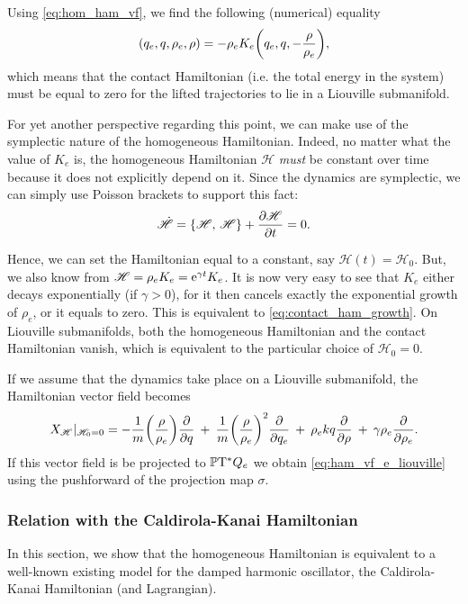 Using \cref{eq:hom_ham_vf}, we find the following (numerical) equality 
\begin{equation}
    [\intpr{X_\mathscr{H}}{\theta_e}](q_e, q, \rho_e, \rho) = -\rho_e K_e\qty(q_e, q, -\frac{\rho}{\rho_e}),
\end{equation}
which means that the contact Hamiltonian (i.e. the total energy in the system)
must be equal to zero for the lifted trajectories to lie in a Liouville submanifold.

For yet another perspective regarding this point, we can make use of the symplectic nature of the homogeneous Hamiltonian. Indeed, no matter what the value of \(K_e\) is, the homogeneous Hamiltonian \(\mathscr{H}\) \emph{must} be constant over time because it does not explicitly depend on it. Since the dynamics are symplectic, we can simply use Poisson brackets to support this fact:
\begin{equation}
     \dot{\mathscr{H}} = \qty{\mathscr{H},\,\mathscr{H}} + \pdv{\mathscr{H}}{t} = 0.
\end{equation}

Hence, we can set the Hamiltonian equal to a constant, say \(\mathscr{H}(t) = \mathscr{H}_0\). But, we also know from \(\mathscr{H} = \rho_e K_e = \mathrm{e}^{\gamma t} K_e\). It is now very easy to see that \(K_e\) either  decays exponentially (if \(\gamma > 0\)), for it then cancels exactly the exponential growth of \(\rho_e\), or it equals to zero. This is equivalent to \cref{eq:contact_ham_growth}. On Liouville submanifolds, both the homogeneous Hamiltonian and the contact Hamiltonian vanish, which is equivalent to the particular choice of \(\mathscr{H}_0 = 0\).

If we assume that the dynamics take place on a Liouville submanifold, the Hamiltonian vector field becomes
\begin{equation}
     X_\mathscr{H}\vert_{\mathscr{H}_0 = 0} =  -\frac{1}{m}\qty(\frac{\rho}{\rho_e})\pdv{}{q}\: + \: \frac{1}{m}\qty(\frac{\rho}{\rho_e})^2\pdv{}{q_e}\: + \: \rho_e kq \pdv{}{\rho}\: + \: \gamma \rho_e \pdv{}{\rho_e}.    
\end{equation}
If this vector field is be projected to \(\mathbb{P}\mathrm{T}^* Q_e\)  we obtain \cref{eq:ham_vf_e_liouville} using the pushforward of the projection map \(\sigma\).

\subsubsection{Relation with the Caldirola-Kanai Hamiltonian}
In this section, we show that the homogeneous Hamiltonian is equivalent to a well-known existing model for the damped harmonic oscillator, the Caldirola-Kanai Hamiltonian (and Lagrangian).

